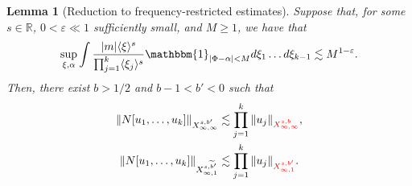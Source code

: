 \documentclass[a4paper, 11pt]{amsart}
\newcommand{\R}{\mathbb{R}}
\newcommand{\jap}[1]{\langle #1 \rangle}
\newcommand{\fia}{\mathbbm{1}_{|\Phi-\alpha|<M}}
\theoremstyle{plain}
\newtheorem{lem}[thm]{Lemma}
\theoremstyle{definition}
\theoremstyle{remark}
\newcommand{\5}{\text{V}}
\newcommand{\les}{\lesssim}
\newcommand{\eps}{\varepsilon}
\newcommand{\wt}{\widetilde}
\numberwithin{equation}{section}
\theoremstyle{mytheoremstyle} \newtheorem{nota}[thm]{Remark}
\theoremstyle{mytheoremstyle} \newtheorem{exemplo}[thm]{Example}
\newcommand{\red}{\color{red}}
\begin{document}
\begin{lem}[Reduction to frequency-restricted estimates]\label{lem:bourg_fre}
Suppose that, for some $s\in \R$, $0<\eps\ll1$ sufficiently small, and $M\ge1$, we have that
\begin{equation}\label{eq:fre_geral}
    \sup_{\xi,\alpha} \int \frac{|m|\jap{\xi}^s}{\prod_{j=1}^k \jap{\xi_j}^s} \fia d\xi_1\dots d\xi_{k-1} \lesssim M^{1-\eps}.
\end{equation}
Then, there exist {\red$b>1/2$ and $b-1<b'<0$} such that
\begin{align}
	\|N[u_1,\dots, u_k] \|_{X^{s,b'}_{\infty, \infty}} & \les \prod_{j=1}^k\|u_j\|_{\red X^{s,b}_{\infty, \infty}}, \\
 \|N[u_1,\dots, u_k] \|_{X^{s,\wt{b}'}_{\infty, 1}} & \les \prod_{j=1}^k\|u_j\|_{\red X^{s,b'}_{\infty, 1}}.
\end{align}
\end{lem}
\end{document}
